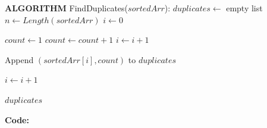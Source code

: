 \documentclass[12pt]{article}
\begin{document}
\begin{algorithm}[H]
\caption{FindDuplicates:}
\begin{algorithmic}[1]

\State \textbf{ALGORITHM} FindDuplicates($sortedArr$):
    \State $duplicates \gets$ empty list
    \State $n \gets Length(sortedArr)$
    \State $i \gets 0$

        \State $count \gets 1$
            \State $count \gets count + 1$
            \State $i \gets i + 1$
        \EndWhile

            \State Append $(sortedArr[i], count)$ to $duplicates$
        \EndIf

        \State $i \gets i + 1$
    \EndWhile

    \State \Return $duplicates$

\end{algorithmic}
\end{algorithm}

\textbf{Code:}
\end{document}
